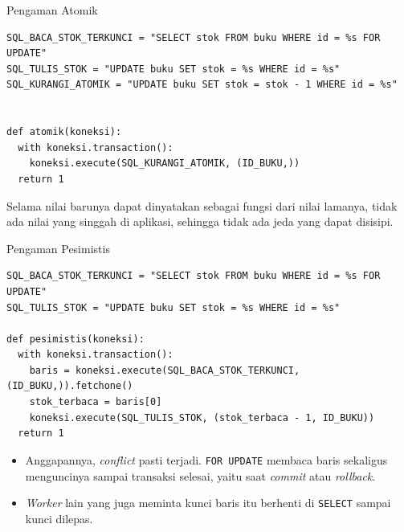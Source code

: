 \documentclass[aspectratio=169, table, 12pt]{beamer}
\begin{document}
\begin{frame}[fragile]{{\Large Pengaman Atomik}}
  \vspace{2pt}
\begin{lstlisting}[style=PythonStyle]
SQL_BACA_STOK_TERKUNCI = "SELECT stok FROM buku WHERE id = %s FOR UPDATE"
SQL_TULIS_STOK = "UPDATE buku SET stok = %s WHERE id = %s"
SQL_KURANGI_ATOMIK = "UPDATE buku SET stok = stok - 1 WHERE id = %s"


def atomik(koneksi):
  with koneksi.transaction():
    koneksi.execute(SQL_KURANGI_ATOMIK, (ID_BUKU,))
  return 1
\end{lstlisting}

  \vspace{2pt}
  {\footnotesize Selama nilai barunya dapat dinyatakan sebagai fungsi dari
  nilai lamanya, tidak ada nilai yang singgah di aplikasi, sehingga tidak ada
  jeda yang dapat disisipi.}
\end{frame}

\begin{frame}[fragile]{{\Large Pengaman Pesimistis}}
  \vspace{2pt}
\begin{lstlisting}[style=PythonStyle]
SQL_BACA_STOK_TERKUNCI = "SELECT stok FROM buku WHERE id = %s FOR UPDATE"
SQL_TULIS_STOK = "UPDATE buku SET stok = %s WHERE id = %s"

def pesimistis(koneksi):
  with koneksi.transaction():
    baris = koneksi.execute(SQL_BACA_STOK_TERKUNCI, (ID_BUKU,)).fetchone()
    stok_terbaca = baris[0]
    koneksi.execute(SQL_TULIS_STOK, (stok_terbaca - 1, ID_BUKU))
  return 1
\end{lstlisting}

  \vspace{2pt}
  \begin{itemize}
    \item Anggapannya, \textit{conflict} pasti terjadi. \texttt{FOR UPDATE}
          membaca baris sekaligus menguncinya sampai transaksi selesai, yaitu
          saat \textit{commit} atau \textit{rollback}.
    \item \textit{Worker} lain yang juga meminta kunci baris itu berhenti di
          \texttt{SELECT} sampai kunci dilepas.
  \end{itemize}
\end{frame}
\end{document}
